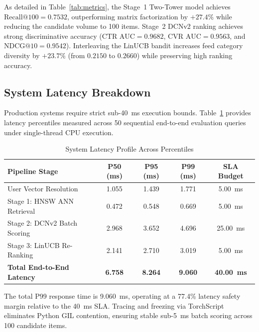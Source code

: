 As detailed in Table~\ref{tab:metrics}, the Stage~1 Two-Tower model achieves $\text{Recall@100} = 0.7532$, outperforming matrix factorization by $+27.4\%$ while reducing the candidate volume to 100 items. Stage~2 DCNv2 ranking achieves strong discriminative accuracy ($\text{CTR AUC} = 0.9682$, $\text{CVR AUC} = 0.9563$, and $\text{NDCG@10} = 0.9542$). Interleaving the LinUCB bandit increases feed category diversity by $+23.7\%$ (from $0.2150$ to $0.2660$) while preserving high ranking accuracy.

\subsection{System Latency Breakdown}
Production systems require strict sub-40~ms execution bounds. Table~\ref{tab:latency} provides latency percentiles measured across 50 sequential end-to-end evaluation queries under single-thread CPU execution.

\begin{table}[h]
\centering
\caption{System Latency Profile Across Percentiles}
\label{tab:latency}
\begin{tabular}{lcccc}
\hline
\textbf{Pipeline Stage} & \textbf{P50 (ms)} & \textbf{P95 (ms)} & \textbf{P99 (ms)} & \textbf{SLA Budget} \\
\hline
User Vector Resolution & 1.055 & 1.439 & 1.771 & 5.00~ms \\
Stage 1: HNSW ANN Retrieval & 0.472 & 0.548 & 0.669 & 5.00~ms \\
Stage 2: DCNv2 Batch Scoring & 2.968 & 3.652 & 4.696 & 25.00~ms \\
Stage 3: LinUCB Re-Ranking & 2.141 & 2.710 & 3.019 & 5.00~ms \\
\hline
\textbf{Total End-to-End Latency} & \textbf{6.758} & \textbf{8.264} & \textbf{9.060} & \textbf{40.00~ms} \\
\hline
\end{tabular}
\end{table}

The total P99 response time is 9.060~ms, operating at a 77.4\% latency safety margin relative to the 40~ms SLA. Tracing and freezing via TorchScript eliminates Python GIL contention, ensuring stable sub-5~ms batch scoring across 100 candidate items.
